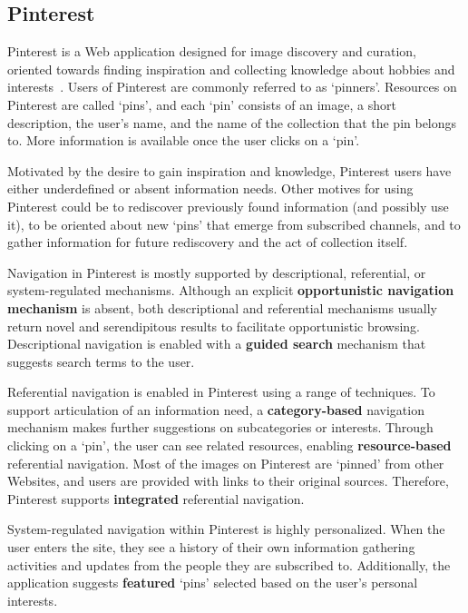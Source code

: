 \documentclass{sigchi}
\begin{document}
{\subsection{Pinterest}
Pinterest is a Web application designed for image discovery and curation, oriented towards finding inspiration and collecting knowledge about hobbies and interests~\cite{gilbert2013need,zarro2012pinterest,ottoni2013ladies}.  Users of Pinterest are commonly referred to as `pinners'. Resources on Pinterest are called `pins', and each `pin' consists of an image, a short description, the user's name, and the name of the collection that the pin belongs to. More information is available once the user clicks on a `pin'.

Motivated by the desire to gain inspiration and knowledge, Pinterest users have either underdefined or absent information needs. Other motives for using Pinterest could be to rediscover previously found information (and possibly use it), to be oriented about new `pins' that emerge from subscribed channels, and to gather information for future rediscovery and the act of collection itself.


Navigation in Pinterest is mostly supported by descriptional, referential, or system-regulated mechanisms. Although an explicit \textbf{opportunistic navigation mechanism} is absent, both descriptional and referential mechanisms usually return novel and serendipitous results to facilitate opportunistic browsing. Descriptional navigation is enabled with a \textbf{guided search} mechanism that suggests search terms to the user. 

Referential navigation is enabled in Pinterest using a range of techniques. To support articulation of an information need, a \textbf{category-based} navigation mechanism makes further suggestions on subcategories or interests. Through clicking on a `pin', the user can see related resources, enabling \textbf{resource-based} referential navigation. Most of the images on Pinterest are `pinned' from other Websites, and users are provided with links to their original sources. Therefore, Pinterest supports \textbf{integrated} referential navigation.

System-regulated navigation within Pinterest is highly personalized. When the user enters the site, they see a history of their own information gathering activities and updates from the people they are subscribed to. Additionally, the application suggests \textbf{featured} `pins' selected based on the user's personal interests.

}
\end{document}
